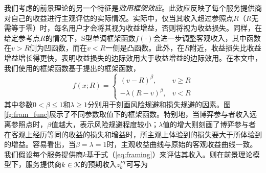我们考虑的前景理论的另一个特征是\emph{效用框架效应}。此效应反映了每个服务提供商对自己的收益进行主观评估的实际情况。实际中，仅当其收入超过参照点$R$（$R$无需等于零）时，每名用户才会将其视为收益增益，否则将视为收益损失。同样，在给定参考点$R$的情况下，S型单调框架函数$f(\cdot)$会进一步调整客观收入，其中函数在$v>R$侧为凹函数，而在$v<R$一侧是凸函数。此外，在$R$附近，收益损失比收益增益增长得更快，表明收益损失的边际效用大于收益增益的边际效用。在本文中，我们使用的框架函数基于\cite{Kahneman}提出的框架函数，
\begin{equation}\label{eq:framing}
f(x;R)=
\begin{cases}
(v - R)^{\beta}, &v\geq R\\
-\lambda(R-v)^{\beta}, &v<R
\end{cases}
\end{equation}
其中参数$0<\beta\leq 1$和$\lambda\geq 1$分别用于刻画风险规避和损失规避的因素。图\ref{fg:fram_func}展示了不同参数取值下的框架函数。特别地，当博弈参与者收入远离参照点时，$\beta$值越大，表示风险规避程度较小；$\lambda$值的增大则刻画了博弈参与者在客观上经历等同的收益的损失和增益时，所主观上体验到的损失要大于所体验到的增益。容易看出，当$\beta=\lambda=1$时，主观收益曲线与原始的客观收益曲线一致。我们假设每个服务提供商$k$基于式（\ref{eq:framing}）来评估其收入。则在前景理论模型下，服务提供商$ k\in\mathcal{K}$的预期收入$z_k^{PT}$可写为

